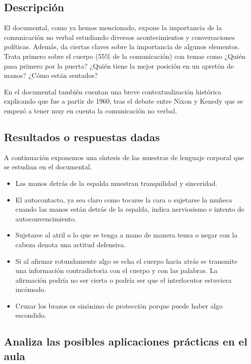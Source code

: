 \documentclass[palatino,nochap]{apuntesURJC}
\begin{document}
\subsection{Descripción}

El documental, como ya hemos mencionado, expone la importancia de la comunicación no verbal estudiando diversos acontecimientos y conversaciones políticas.
%
Además, da ciertas claves sobre la importancia de algunos elementos.
%
Trata primero sobre el cuerpo (55\% de la comunicación) con temas como ¿Quién pasa primero por la puerta? ¿Quién tiene la mejor posición en un apretón de manos? ¿Cómo están sentados?

En el documental también cuentan una breve contextualización histórica explicando que fue a partir de 1960, tras el debate entre Nixon y Kenedy que se empezó a tener muy en cuenta la comunicación no verbal.


\subsection{Resultados o respuestas dadas}

A continuación exponemos una síntesis de las muestras de lenguaje corporal que se estudian en el documental.

\begin{itemize}
\item Las manos detrás de la espalda muestran tranquilidad y sinceridad.
\item El autocontacto, ya sea claro como tocarse la cara o sujetarse la muñeca cuando las manos están detrás de la espalda, indica nerviosismo e intento de autoconvencimiento.
\item Sujetarse al atril o lo que se tenga a mano de manera tensa o negar con la cabeza denota una actitud defensiva.
\item Si al afirmar rotundamente algo se echa el cuerpo hacia atrás se transmite una información contradictoria con el cuerpo y con las palabras. La afirmación podría no ser cierta o podría ser que el interlocutor estuviera incómodo.
\item Cruzar los brazos es sinónimo de protección porque puede haber algo escondido.
\end{itemize}


\subsection{Analiza las posibles aplicaciones prácticas en el aula}
\end{document}
